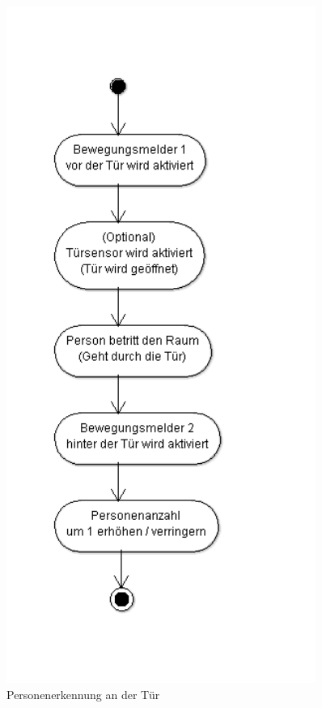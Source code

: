 \documentclass[12pt, oneside, smallheadings]{scrbook}
\begin{document}
\begin{figure}[h!]
	\centering
	\includegraphics[width=0.9\textwidth]{img/Szenarien/Personenerkennung_an_Tuer.png}
	\caption{Personenerkennung an der Tür}
	\label{fig:szenarienPersonenerkennungTür}
\end{figure}
\end{document}
